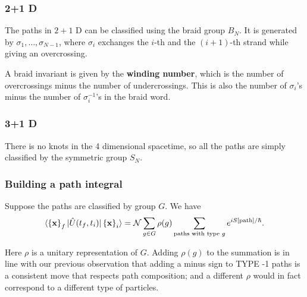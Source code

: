 \subsubsection{2+1 D}

The paths in $2+1$ D can be classified using the braid group $B_N$. It is generated by $\sigma_1, \ldots , \sigma_{N-1}$, where $\sigma_i$  exchanges the $i$-th and the $(i+1)$-th strand while giving an overcrossing. 


A braid invariant is given by the \textbf{winding number}, which is the number of overcrossings minus the number of undercrossings. This is also the number of $\sigma_i$'s minus the number of $\sigma_i ^{-1}$'s in the braid word.

\subsubsection{3+1 D}

There is no knots in the 4 dimensional spacetime, so all the paths are simply classified by the symmetric group $S_N$. 


\subsubsection{Building a path integral}

Suppose the paths are classified by group $G$. We have
 $$
\langle \left\{ \vb x \right\} _f  | \hat{U} (t_f , t_i) | \left\{ \vb x \right\} _i  \rangle = \mathcal{N} \sum_{g \in  G} \rho(g) \sum_{\text{paths with type } g} e^{i S[\text{path}] / \hbar}
.$$

Here $\rho$ is a unitary representation of $G$. Adding $\rho(g)$ to the summation  is in line with our previous observation that adding a minus sign to TYPE -1 paths is a consistent move that respects path composition; and a different $\rho$ would  in fact correspond to a different type of particles. 









